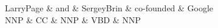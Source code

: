 \documentclass{article}
\begin{document}
\thispagestyle{empty}
\begin{center}
 \begin{dependency}[theme = default]
   \begin{deptext}[column sep=1em]
   LarryPage \& and \& SergeyBrin \& co-founded \& Google \\
   NNP \& CC \& NNP \& VBD \& NNP \\
   \end{deptext}
\end{dependency} \\
\end{center}
\end{document}

